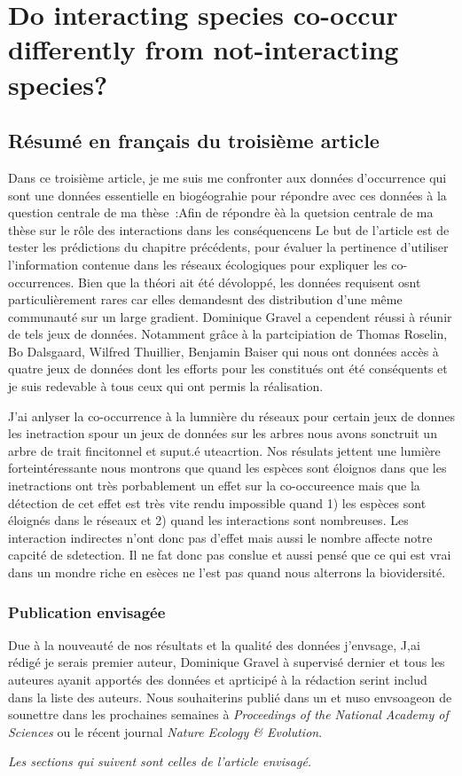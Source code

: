 \chapter{Do interacting species co-occur differently from not-interacting species?}


\section{Résumé en français du troisième article}

Dans ce troisième article, je me suis me confronter aux données d'occurrence qui sont une données essentielle en biogéograhie pour répondre avec ces données à la question centrale de ma thèse~:Afin de répondre èà la quetsion centrale de ma thèse sur le rôle des interactions dans les conséquencens
Le but de l'article est de tester les prédictions du chapitre précédents, pour évaluer la pertinence d'utiliser l'information
contenue dans les réseaux écologiques pour expliquer les co-occurrences.
Bien que la théori ait été dévoloppé, les données requisent osnt particulièrement rares car elles demandesnt des distribution d'une même communauté sur un large gradient. Dominique Gravel a cependent réussi à réunir de tels jeux de données. Notamment grâce à la partcipiation de Thomas Roselin, Bo Dalsgaard, Wilfred Thuillier, Benjamin Baiser qui nous ont données accès à quatre jeux de données dont les efforts pour les constitués ont été conséquents et je suis redevable à tous ceux qui ont permis la réalisation.

J'ai anlyser la co-occurrence à la lumnière du réseaux pour certain jeux de donnes les inetraction spour un jeux de données sur les arbres nous avons sonctruit un arbre de trait fincitonnel et suput.é uteacrtion. Nos résulats jettent une lumière forteintéressante nous montrons que quand les espèces sont éloignos dans  que les inetractions ont très porbablement un effet sur la co-occureence mais que la détection de cet effet est très vite rendu impossible quand 1) les espèces sont éloignés dans le réseaux et 2) quand les interactions sont nombreuses. Les interaction indirectes n'ont donc pas d'effet mais aussi le nombre affecte notre capcité de sdetection. Il ne fat donc pas conslue et aussi pensé que ce qui est vrai dans un mondre riche en esèces ne l'est pas quand nous alterrons la biovidersité.



\subsection{Publication envisagée}

Due à la nouveauté de nos résultats et la qualité des données j'envsage, J,ai rédigé je serais premier auteur, Dominique Gravel à supervisé dernier et tous les auteures ayanit apportés des données et aprticipé à la rédaction serint includ dans la liste des auteurs. Nous souhaiterins publié dans un et nuso envsoageon de sounettre dans les prochaines semaines à \emph{Proceedings of the National Academy of Sciences} ou le récent journal \emph{Nature Ecology \& Evolution}.



\emph{Les sections qui suivent sont celles de l'article envisagé.}


\newpage
